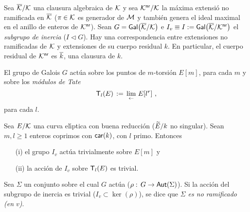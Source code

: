Sea $\clos{\cal{K}}/\cal{K}$ una clausura algebraica de $\cal{K}$ y sea
$\closnr{\cal{K}}/\cal{K}$ la m\'{a}xima extensi\'{o} no ramificada en
$\clos{\cal{K}}$ ($\pi\in\cal{K}$ es generador de $\cal{M}$ y tambi\'{e}n
genera el ideal maximal en el anillo de enteros de $\closnr{\cal{K}}$). Sean
$G=\galois{\clos{\cal{K}}/\cal{K}}$ e
$I_{v}\equiv I:=\galois{\clos{\cal{K}}/\closnr{\cal{K}}}$ el \emph{subgrupo %
de inercia} ($I\triangleleft G$). Hay una correspondencia entre extensiones no
ramificadas de $\cal{K}$ y  extensiones de su cuerpo residual $k$. En
particular, el cuerpo residual de $\closnr{\cal{K}}$ es $\clos{k}$, una
clausura de $k$.

El grupo de Galois $G$ act\'{u}a sobre los puntos de $m$-torsi\'{o}n $E[m]$,
para cada $m$ y sobre los \emph{m\'{o}dulos de Tate}
\begin{equation}
	\label{eq:modulodetate}
	\tate[l](E) \,:=\,\limproy\,E[l^r]
	\text{ ,}
\end{equation}
%
para cada $l$.

\begin{propoAccionDeInercia}\label{propo:acciondeinercia}
	Sea $E/\cal{K}$ una curva el\'{\i}ptica con buena reducci\'{o}n
	($\reducido{E}/k$ no singular). Sean $m,l\geq 1$ enteros coprimos con
	$\char{k}$, con $l$ primo. Entonces
	\begin{itemize}
		\item[(i)] el grupo $I_{v}$ act\'{u}a trivialmente sobre
			$E[m]$ y
		\item[(ii)] la acci\'{o}n de $I_{v}$ sobre $\tate[l](E)$ es
			trivial.
	\end{itemize}
\end{propoAccionDeInercia}

\begin{defConjuntoNoRamificado}\label{def:conjuntonoramificado}
	Sea $\Sigma$ un conjunto sobre el cual $G$ act\'{u}a
	($\rho:\,G\rightarrow\Auto(\Sigma)$). Si la acci\'{o}n del subgrupo de
	inercia es trivial ($I_{v}\subset\ker(\rho)$), se dice que
	\emph{$\Sigma$ es no ramificado (en $v$)}.
\end{defConjuntoNoRamificado}

